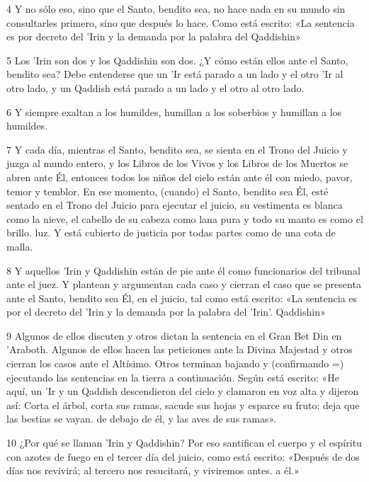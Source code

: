 \par 4 Y no sólo eso, sino que el Santo, bendito sea, no hace nada en su mundo sin consultarles primero, sino que después lo hace. Como está escrito: «La sentencia es por decreto del 'Irin y la demanda por la palabra del Qaddishin»

\par 5 Los 'Irin son dos y los Qaddishin son dos. ¿Y cómo están ellos ante el Santo, bendito sea? Debe entenderse que un 'Ir está parado a un lado y el otro 'Ir al otro lado, y un Qaddish está parado a un lado y el otro al otro lado.

\par 6 Y siempre exaltan a los humildes, humillan a los soberbios y humillan a los humildes.

\par 7 Y cada día, mientras el Santo, bendito sea, se sienta en el Trono del Juicio y juzga al mundo entero, y los Libros de los Vivos y los Libros de los Muertos se abren ante Él, entonces todos los niños del cielo están ante él con miedo, pavor, temor y temblor. En ese momento, (cuando) el Santo, bendito sea Él, esté sentado en el Trono del Juicio para ejecutar el juicio, su vestimenta es blanca como la nieve, el cabello de su cabeza como lana pura y todo su manto es como el brillo. luz. Y está cubierto de justicia por todas partes como de una cota de malla.

\par 8 Y aquellos 'Irin y Qaddishin están de pie ante él como funcionarios del tribunal ante el juez. Y plantean y argumentan cada caso y cierran el caso que se presenta ante el Santo, bendito sea Él, en el juicio, tal como está escrito: «La sentencia es por el decreto del 'Irin y la demanda por la palabra del 'Irin'. Qaddishin»

\par 9 Algunos de ellos discuten y otros dictan la sentencia en el Gran Bet Din en 'Araboth. Algunos de ellos hacen las peticiones ante la Divina Majestad y otros cierran los casos ante el Altísimo. Otros terminan bajando y (confirmando =) ejecutando las sentencias en la tierra a continuación. Según está escrito: «He aquí, un 'Ir y un Qaddish descendieron del cielo y clamaron en voz alta y dijeron así: Corta el árbol, corta sus ramas, sacude sus hojas y esparce su fruto: deja que las bestias se vayan. de debajo de él, y las aves de sus ramas».

\par 10 ¿Por qué se llaman 'Irin y Qaddishin? Por eso santifican el cuerpo y el espíritu con azotes de fuego en el tercer día del juicio, como está escrito: «Después de dos días nos revivirá; al tercero nos resucitará, y viviremos antes. a él.»

